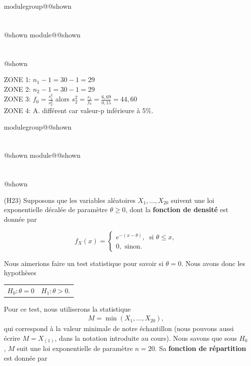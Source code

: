 \documentclass{Evaluation}
\makeatletter
\newcommand{\currentmodulekey}{}
\newcommand{\currentmoduletitle}{}
\newcommand{\currentgroupkey}{}
\newcommand{\currentgrouptitle}{}
\newcommand{\showmoduleifneeded}{%
  \ifx\currentgroupkey\empty\else
    \expandafter\ifx\csname modulegroup@\currentgroupkey @shown\endcsname\relax
      \section*{\currentgrouptitle}%
      \expandafter\gdef\csname modulegroup@\currentgroupkey @shown\endcsname{1}%
    \fi
  \fi
  \expandafter\ifx\csname module@\currentmodulekey @shown\endcsname\relax
    \section*{\currentmoduletitle}%
    \expandafter\gdef\csname module@\currentmodulekey @shown\endcsname{1}%
  \fi
}
\newenvironment{H23}{\showmoduleifneeded}{}
\makeatother
\begin{document}
\begin{questions}
\begin{H23}
\begin{parts}

\end{parts}

	\begin{solution}
		ZONE 1:  $n_1-1=30-1=29$\\
		ZONE 2:  $n_2-1=30-1=29$\\
		ZONE 3: $\displaystyle f_0= \frac{s_1^2}{s_2^2}$ alors
		$ \displaystyle s_2^2 = \frac{s_1}{f_0}
		= \frac{6,69}{0,15}
		= 44,60	$ \\
		ZONE 4: A. différent car valeur-p inférieure à 5\%.\\
	\end{solution}

\end{H23}

\begin{H23}
\question
(H23) Supposons que les variables aléatoires $X_1,...,X_{20}$ suivent une loi exponentielle décalée de paramètre $\theta \geq0 $, dont la \textbf{fonction de densité} est donnée par 

 \begin{equation*}
  f_X(x) = \begin{cases}
         e^{-(x-\theta)},\ \text{  si  } \theta \leq x , \\
        0, \text{ sinon.}
        \end{cases}
 \end{equation*}

Nous aimerions faire un test statistique pour savoir si $\theta=0$. Nous avons donc les hypothèses

\begin{table}[ht]
    \centering
    \begin{tabular}{cc}
         $H_0: \theta=0$ & $H_1: \theta > 0$.
    \end{tabular}
\end{table}
Pour ce test, nous utiliserons la statistique
\begin{align*}
    M=\min (X_1,...,X_{20}),
\end{align*}
qui correspond à la valeur minimale de notre échantillon (nous pouvons aussi écrire $M=X_{(1)}$, dans la notation introduite au cours).
Nous savons que sous $H_0$, $M$ suit une loi exponentielle de paramètre $n=20$. Sa \textbf{fonction de répartition} est donnée par 


\end{H23}
\end{questions}
\end{document}
